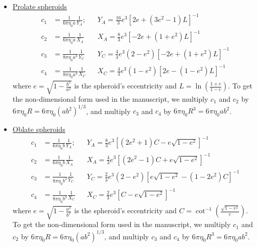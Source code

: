 \documentclass{jfm}
\begin{document}
\begin{itemize}
    \item \underline{Prolate spheroids}
    \begin{subequations}
        \begin{align}
            c_1 &= \frac{1}{6\pi \eta_0 a} \frac{1}{Y_A}; & 
            &Y_A = \frac{16}{3} e^3 \left[2e + (3e^2 -1)L\right]^{-1}  \\     
        c_2 &= \frac{1}{6\pi \eta_0 a} \frac{1}{X_A} & &X_A = \frac{8}{3} e^3 \left[-2e + (1+e^2)L\right]^{-1}\\
       c_3 &= \frac{1}{8\pi \eta_0 a^3} \frac{1}{Y_C} & &Y_C = \frac{4}{3} e^3 (2-e^2) \left[-2e + (1+e^2)L\right]^{-1} \\
        c_4 &= \frac{1}{8\pi \eta_0 a^3} \frac{1}{X_C} & &X_C = \frac{4}{3} e^3 (1-e^2) \left[2e - (1-e^2)L\right]^{-1}
        \end{align}
    \end{subequations}
    where $e = \sqrt{1 - \frac{b^2}{a^2}}$ is the spheroid's eccentricity and $L = \ln \left( \frac{1+e}{1-e} \right)$.   To get the non-dimensional form used in the manuscript, we multiply $c_1$ and $c_2$ by $6\pi\eta_0 R = 6\pi \eta_0 (ab^2)^{1/3}$, and multiply $c_3$ and $c_4$ by $6\pi\eta_0 R^3 = 6\pi \eta_0 ab^2$.\\
    
    \item \underline{Oblate spheroids}
        \begin{subequations}
        \begin{align}
            c_1 &= \frac{1}{6\pi \eta_0 b} \frac{1}{Y_A}; &             &Y_A = \frac{8}{3} e^3 \left[(2e^2 + 1) C - e\sqrt{1-e^2}\right]^{-1} \\        
        c_2 &= \frac{1}{6\pi \eta_0 b} \frac{1}{X_A} & &X_A = \frac{4}{3} e^3 \left[(2e^2 - 1) C + e\sqrt{1-e^2}\right]^{-1} \\
        c_3 &= \frac{1}{8\pi \eta_0 b^3} \frac{1}{Y_C} & &Y_C = \frac{2}{3} e^3 (2-e^2) \left[e\sqrt{1-e^2} - (1 - 2e^2) C \right]^{-1} \\
        c_4 &= \frac{1}{8\pi \eta_0 b^3} \frac{1}{X_C} & &X_C = \frac{2}{3} e^3 \left[C - e\sqrt{1-e^2}\right]^{-1}
        \end{align}
    \end{subequations}
    where $e = \sqrt{1 - \frac{a^2}{b^2}}$ is the spheroid's eccentricity and $C = \cot^{-1} \left( \frac{\sqrt{1-e^2}}{e} \right)$.  To get the non-dimensional form used in the manuscript, we multiply $c_1$ and $c_2$ by $6\pi\eta_0 R = 6\pi \eta_0 (ab^2)^{1/3}$, and multiply $c_3$ and $c_4$ by $6\pi\eta_0 R^3 = 6\pi \eta_0 ab^2$.
\end{itemize}
\end{document}
